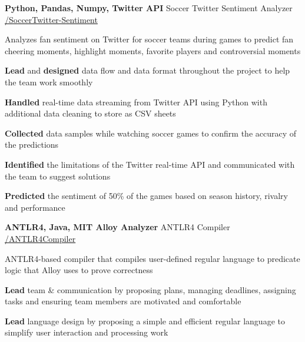 \begin{cventries}
  \cventry
    {\textbf{Python, Pandas, Numpy, Twitter API}} %
    {Soccer Twitter Sentiment Analyzer} %
    {\href{https://github.com/basulaib/SoccerTwitter-Sentiment}{\faGithub /SoccerTwitter-Sentiment}} %
    {} %
    {
      \begin{cvitems} %
        \item {Analyzes fan sentiment on Twitter for soccer teams during games to predict fan cheering moments, highlight moments, favorite players and controversial moments}
        \item {\textbf{Lead} and \textbf{designed} data flow and data format throughout the project to help the team work smoothly}
        \item {\textbf{Handled} real-time data streaming from Twitter API using Python with additional data cleaning to store as CSV sheets}
        \item {\textbf{Collected} data samples while watching soccer games to confirm the accuracy of the predictions}
        \item {\textbf{Identified} the limitations of the Twitter real-time API and communicated with the team to suggest solutions}
        \item {\textbf{Predicted} the sentiment of 50\% of the games based on season history, rivalry and performance}
      \end{cvitems}
    }
    

  \cventry
    {\textbf{ANTLR4, Java, MIT Alloy Analyzer}} %
    {ANTLR4 Compiler} %
    {\href{https://github.com/basulaib/ANTLR4Compiler}{\faGithub /ANTLR4Compiler}} %
    {} %
    {
      \begin{cvitems} %
        \item {ANTLR4-based compiler that compiles user-defined regular language to predicate logic that Alloy uses to prove correctness}
        \item {\textbf{Lead} team \& communication by proposing plans, managing deadlines, assigning tasks and ensuring team members are motivated and comfortable}
        \item {\textbf{Lead} language design by proposing a simple and efficient regular language to simplify user interaction and processing work}
      \end{cvitems}
    }
    


\end{cventries}
